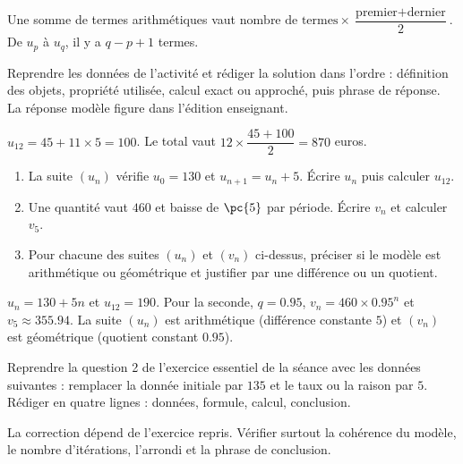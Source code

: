 \begin{summary}Une somme de termes arithmétiques vaut $\text{nombre de termes}\times\dfrac{\text{premier}+\text{dernier}}2$. De $u_p$ à $u_q$, il y a $q-p+1$ termes.\end{summary}

\begin{example}
Reprendre les données de l'activité et rédiger la solution dans l'ordre : définition des objets, propriété utilisée, calcul exact ou approché, puis phrase de réponse. La réponse modèle figure dans l'édition enseignant.
\end{example}
\begin{solution}$u_{12}=45+11\times5=100$. Le total vaut $12\times\dfrac{45+100}{2}=870$ euros.\end{solution}

\begin{exercise}[essentiel]
\begin{enumerate}\item La suite $(u_n)$ vérifie $u_0=130$ et $u_{n+1}=u_n+5$. Écrire $u_n$ puis calculer $u_{12}$.\item Une quantité vaut $460$ et baisse de $\pc{5}$ par période. Écrire $v_n$ et calculer $v_5$.\item Pour chacune des suites $(u_n)$ et $(v_n)$ ci-dessus, préciser si le modèle est arithmétique ou géométrique et justifier par une différence ou un quotient.\end{enumerate}
\end{exercise}
\begin{solution}$u_n=130+5n$ et $u_{12}=190$. Pour la seconde, $q=\num{0,95}$, $v_n=460\times\num{0,95}^n$ et $v_5\approx\num{355,94}$. La suite $(u_n)$ est arithmétique (différence constante $5$) et $(v_n)$ est géométrique (quotient constant $\num{0,95}$).\end{solution}


\begin{homework}Reprendre la question 2 de l'exercice essentiel de la séance avec les données suivantes : remplacer la donnée initiale par $135$ et le taux ou la raison par $5$. Rédiger en quatre lignes : données, formule, calcul, conclusion.\end{homework}
\begin{solution}La correction dépend de l'exercice repris. Vérifier surtout la cohérence du modèle, le nombre d'itérations, l'arrondi et la phrase de conclusion.\end{solution}

